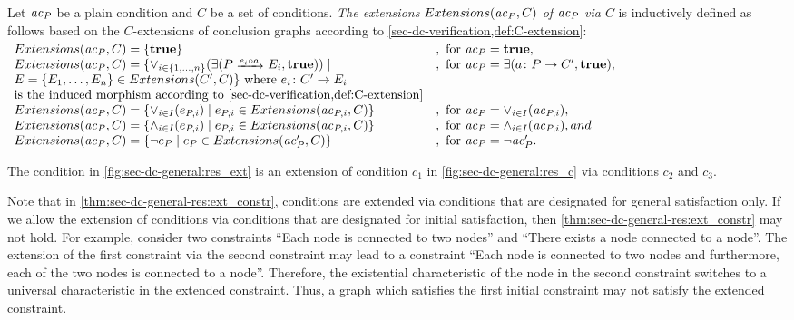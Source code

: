 \begin{definition}
\label{def:sec-dc-general-res:ext_constr}
Let $\mathit{ac}_P$ be a plain condition and $C$ be a set of conditions.
\emph{The extensions $Extensions(\mathit{ac}_P,C)$ of $\mathit{ac}_P$ via $C$} is inductively defined as follows based on the $C$-extensions of conclusion graphs according to \cref{sec-dc-verification,def:C-extension}:
$
  \begin{array}[t]{ll}
  Extensions(\ac_P,C) = \{\true\} & , \text{ for } \ac_P=\true, \\
  Extensions(\ac_P,C) = \{\vee_{i \in \{1,\ldots,n\}}(\exists(P \trans{e_i \circ a} E_i,\true)) \mid & , \text{ for } \ac_P=\exists(a\colon P \to C',\true),\\
  E=\{E_1,\ldots,E_n\} \in Extensions(C',C)\} \text{ where } e_i\colon C' \to E_i & \\
  \text{is the induced morphism according to \cref{sec-dc-verification,def:C-extension}} & \\
  Extensions(\ac_P,C) = \{\vee_{i \in I}(e_{P,i}) \mid e_{P,i} \in Extensions(\ac_{P,i},C)\} & , \text{ for } \ac_P=\vee_{i \in I}(\ac_{P,i}),\\
  Extensions(\ac_P,C) = \{\wedge_{i \in I}(e_{P,i}) \mid e_{P,i} \in Extensions(\ac_{P,i},C)\} & , \text{ for } \ac_P=\wedge_{i \in I}(\ac_{P,i}), and \\
  Extensions(\ac_P,C) = \{\neg e_P \mid e_P \in Extensions(\ac'_P,C)\} & , \text{ for } \ac_P=\neg\ac'_P.
  \end{array}
$
\envEndMarker
\end{definition}

\begin{example}
The condition in \cref{fig:sec-dc-general:res_ext} is an extension of condition $c_1$ in \cref{fig:sec-dc-general:res_c} via conditions $c_2$ and $c_3$.
\envEndMarker
\end{example}

Note that in \cref{thm:sec-dc-general-res:ext_constr}, conditions are extended via conditions that are designated for general satisfaction only.
If we allow the extension of conditions via conditions that are designated for initial satisfaction, then \cref{thm:sec-dc-general-res:ext_constr} may not hold. 
For example, consider two constraints ``Each node  is connected to two  nodes'' and ``There exists a  node connected to a  node''.
The extension of the first constraint via the second constraint may lead to a constraint ``Each node  is connected to two  nodes and furthermore, each of the two  nodes is connected to a  node''.
Therefore, the existential characteristic of the  node in the second constraint switches to a universal characteristic in the extended constraint.
Thus, a graph which satisfies the first initial constraint may not satisfy the extended constraint.

